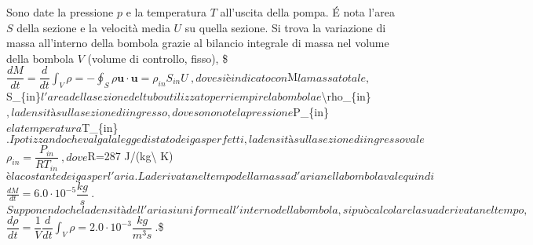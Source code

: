 \documentclass[letterpaper,10pt,italian]{jupyterBook}
\begin{document}
\sphinxAtStartPar
Sono date la pressione \(p\) e la temperatura \(T\) all’uscita della pompa.
É nota l’area \(S\) della sezione e la velocità media \(U\) su quella
sezione. Si trova la variazione di massa all’interno della bombola
grazie al bilancio integrale di massa nel volume della bombola \(V\)
(volume di controllo, fisso),
\$\(\dfrac{d M}{d t} = \dfrac{d}{d t} \int_V \rho = -\oint_S \rho \bm{u} \cdot \bm{u} =
 \rho_{in} S_{in} U \ ,\)\( dove si è indicato con \)M\( la massa totale,
\)S\_\{in\}\( l'area della sezione del tubo utilizzato per riempire la
bombola e \)\textbackslash{}rho\_\{in\}\(, la densità sulla sezione di ingresso, dove sono
note la pressione \)P\_\{in\}\( e la temperatura \)T\_\{in\}\(. Ipotizzando che
valga la legge di stato dei gas perfetti, la densità sulla sezione di
ingresso vale \)\(\rho_{in} = \dfrac{P_{in}}{R T_{in}} \ ,\)\( dove
\)R=287 J/(kg\textbackslash{} K)\( è la costante dei gas per l'aria. La derivata nel
tempo della massa d'aria nella bombola vale quindi
\)\(\frac{d M}{d t} = 6.0 \cdot 10^{-5} \dfrac{kg}{s} \ .\)\( Supponendo che
la densità dell'aria si uniforme all'interno della bombola, si può
calcolare la sua derivata nel tempo,
\)\(\dfrac{d \rho}{d t} = \dfrac{1}{V} \dfrac{d}{dt} \int_V \rho = 2.0 \cdot 10^{-3} \dfrac{kg}{m^3 s} \ .\)\$

\sphinxstepscope
\end{document}
